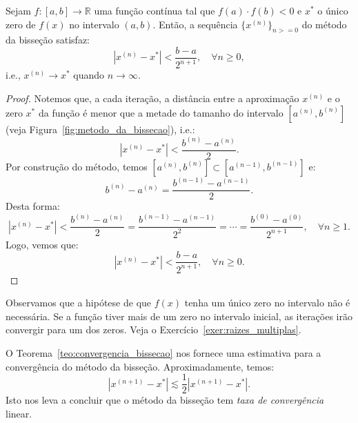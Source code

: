 \begin{teo}\label{teo:convergencia_bissecao} Sejam $f:[a, b]\to \mathbb{R}$ uma função contínua tal que $f(a)\cdot f(b) < 0$ e $x^*$ o único zero de $f(x)$ no intervalo $(a, b)$. Então, a sequência $\{x^{(n)}\}_{n>=0}$ do método da bisseção satisfaz:
  \begin{equation*}
    |x^{(n)} - x^{*}| < \frac{b - a}{2^{n+1}},\quad\forall n\geq 0,
  \end{equation*}
i.e., $x^{(n)}\to x^*$ quando $n\to\infty$.
\end{teo}
\begin{proof}
 Notemos que, a cada iteração, a distância entre a aproximação $x^{(n)}$ e o zero $x^*$ da função é menor que a metade do tamanho do intervalo $[a^{(n)}, b^{(n)}]$ (veja Figura~\ref{fig:metodo_da_bissecao}), i.e.:
\begin{equation*}
  |x^{(n)}-x^*| < \frac{b^{(n)}-a^{(n)}}{2}.
\end{equation*}
Por construção do método, temos $[a^{(n)}, b^{(n)}]\subset [a^{(n-1)}, b^{(n-1)}]$ e:
\begin{equation*}
  b^{(n)} - a^{(n)} = \frac{b^{(n-1)}-a^{(n-1)}}{2}.
\end{equation*}
Desta forma:
\begin{equation*}
  |x^{(n)}-x^*|  < \frac{b^{(n)}-a^{(n)}}{2} = \frac{b^{(n-1)}-a^{(n-1)}}{2^2} = \cdots = \frac{b^{(0)}-a^{(0)}}{2^{n+1}},\quad \forall n\geq 1.
\end{equation*}
Logo, vemos que:
\begin{equation*}
  |x^{(n)}-x^*|  < \frac{b-a}{2^{n+1}},\quad \forall n\geq 0.
\end{equation*} 
\end{proof}

Observamos que a hipótese de que $f(x)$ tenha um único zero no intervalo não é necessária. Se a função tiver mais de um zero no intervalo inicial, as iterações irão convergir para um dos zeros. Veja o Exercício~\ref{exer:raizes_multiplas}.

\begin{obs}
  O Teorema~\ref{teo:convergencia_bissecao} nos fornece uma estimativa para a convergência do método da bisseção. Aproximadamente, temos:
  \begin{equation*}
    |x^{(n+1)} - x^*| \lesssim \frac{1}{2}|x^{(n+1)} - x^*|.
  \end{equation*}
Isto nos leva a concluir que o método da bisseção tem \emph{taxa de convergência} linear.
\end{obs}

